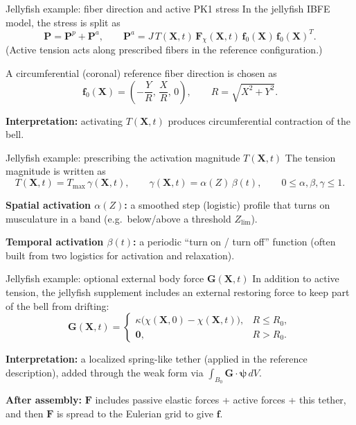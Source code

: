 \documentclass[aspectratio=169]{beamer}
\newcommand{\X}{\bm{X}}
\newcommand{\Gext}{\bm{G}}         %
\newcommand{\fhat}{\bm{f}_0}       %
\newcommand{\Pten}{\bm{P}}        %
\newcommand{\Fdef}{\bm{F}_{\chi}} %
\newcommand{\FLag}{\bm{F}}       %
\newcommand{\fEuler}{\bm{f}}     %
\begin{document}
 \begin{frame}{Jellyfish example: fiber direction and active PK1 stress}
\small
In the jellyfish IBFE model, the stress is split as
\[
\Pten = \Pten^{p} + \Pten^{a},
\qquad
\Pten^{a}=J\,T(\X,t)\,\Fdef(\X,t)\,\fhat(\X)\,\fhat(\X)^{T}.
\]
(Active tension acts along prescribed fibers in the reference configuration.) %

\medskip
A circumferential (coronal) reference fiber direction is chosen as
\[
\fhat(\X)=\left(-\frac{Y}{R},\,\frac{X}{R},\,0\right),
\qquad
R=\sqrt{X^2+Y^2}.
\]

\medskip
\textbf{Interpretation:} activating \(T(\X,t)\) produces circumferential contraction of the bell.
\end{frame}

\begin{frame}{Jellyfish example: prescribing the activation magnitude \(T(\X,t)\)}
\small
The tension magnitude is written as
\[
T(\X,t)=T_{\max}\,\gamma(\X,t),
\qquad
\gamma(\X,t)=\alpha(Z)\,\beta(t),
\qquad 0\le \alpha,\beta,\gamma\le 1.
\]

\medskip
\textbf{Spatial activation \(\alpha(Z)\):} a smoothed step (logistic) profile that turns on musculature
in a band (e.g.\ below/above a threshold \(Z_{\lim}\)).

\medskip
\textbf{Temporal activation \(\beta(t)\):} a periodic “turn on / turn off” function (often built from
two logistics for activation and relaxation).


\end{frame}

\begin{frame}{Jellyfish example: optional external body force \(\Gext(\X,t)\)}
\small
In addition to active tension, the jellyfish supplement includes an external restoring force
to keep part of the bell from drifting:
\[
\Gext(\X,t)=
\begin{cases}
\kappa\big(\chi(\X,0)-\chi(\X,t)\big), & R\le R_0,\\[4pt]
\bm{0}, & R>R_0.
\end{cases}
\]

\medskip
\textbf{Interpretation:} a localized spring-like tether (applied in the reference description),
added through the weak form via \(\int_{B_0}\Gext\cdot \bm{\psi}\,dV\).

\medskip
\textbf{After assembly:} \(\FLag\) includes passive elastic forces + active forces + this tether,
and then \(\FLag\) is spread to the Eulerian grid to give \(\fEuler\).
\end{frame}
\end{document}

